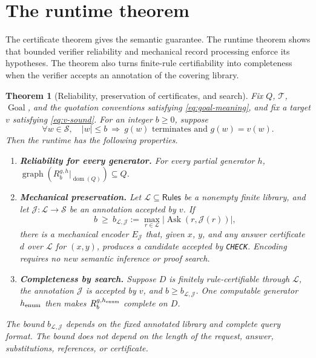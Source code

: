 \documentclass[11pt,twoside]{article}
\newtheorem{theorem}{Theorem}[section]
\theoremstyle{definition}
\newcommand{\Stext}{\mathcal S}
\newcommand{\True}{\mathcal T}
\newcommand{\Lib}{\mathcal L}
\newcommand{\Annot}{\mathcal J}
\newcommand{\Rules}{\mathsf{Rules}}
\newcommand{\Goal}{\operatorname{Goal}}
\newcommand{\Ask}{\operatorname{Ask}}
\newcommand{\dom}{\operatorname{dom}}
\begin{document}
\section{The runtime theorem}
\label{sec:runtime-theorem}

The certificate theorem gives the semantic guarantee. The runtime theorem
shows that bounded verifier reliability and mechanical record processing
enforce its hypotheses. The theorem also turns finite-rule certifiability into
completeness when the verifier accepts an annotation of the covering library.

\begin{theorem}[Reliability, preservation of certificates, and search]
\label{thm:runtime}
Fix $Q$, $\True$, $\Goal$, and the quotation conventions satisfying
\cref{eq:goal-meaning}, and fix a target $v$ satisfying \cref{eq:v-sound}.
For an integer $b\ge0$, suppose
\begin{equation}
\forall w\in\Stext,\quad |w|\le b
\ \Longrightarrow\ g(w)\text{ terminates and }g(w)=v(w).
\label{eq:competence}
\end{equation}
Then the runtime has the following properties.
\begin{enumerate}[label=(\roman*),leftmargin=*]
\item \label{item:runtime-reliability}\textbf{Reliability for every generator.}
For every partial generator $h$,
$\operatorname{graph}(R^{g,h}_b|_{\dom(Q)})\subseteq Q$.
\item \label{item:runtime-preservation}\textbf{Mechanical preservation.}
Let $\Lib\subseteq\Rules$ be a nonempty finite library, and let
$\Annot:\Lib\to\Stext$ be an annotation accepted by $v$. If
\begin{equation}
 b\ \ge\ b_{\Lib,\Annot}:=
 \max_{r\in\Lib}|\Ask(r,\Annot(r))|,
\label{eq:bound}
\end{equation}
there is a mechanical encoder $E_{\Annot}$ that, given $x$, $y$, and any
answer certificate $d$ over $\Lib$ for $(x,y)$, produces a candidate accepted
by \texttt{CHECK}. Encoding requires no new semantic inference or proof search.
\item \label{item:runtime-search}\textbf{Completeness by search.}
Suppose $D$ is finitely rule-certifiable through $\Lib$, the annotation
$\Annot$ is accepted by $v$, and $b\ge b_{\Lib,\Annot}$. One computable
generator $h_{\rm enum}$ then makes
$R^{g,h_{\rm enum}}_b$ complete on $D$.
\end{enumerate}
The bound $b_{\Lib,\Annot}$ depends on the fixed annotated library and complete query format.
The bound does not depend on the length of the request, answer, substitutions,
references, or certificate.
\end{theorem}
\end{document}
